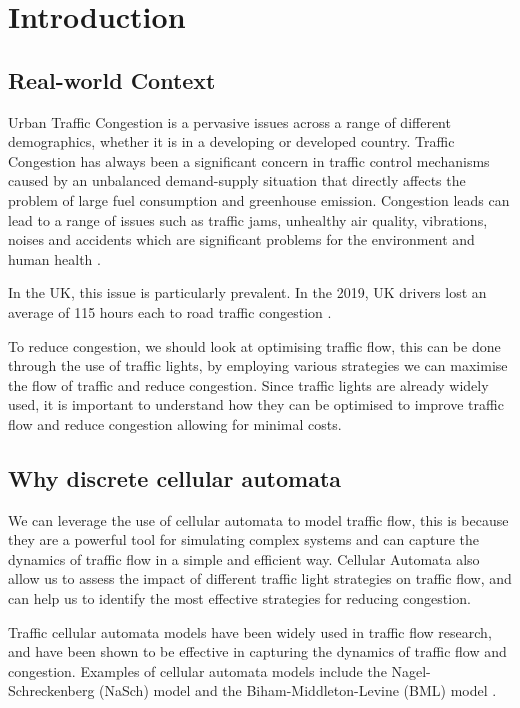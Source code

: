 \section{Introduction}

\subsection{Real-world Context}
Urban Traffic Congestion is a pervasive issues across a range of different demographics, whether it is in a developing or developed country. 
Traffic Congestion has always been a significant concern in traffic control mechanisms caused by an unbalanced demand-supply situation that directly affects the problem of large fuel consumption and greenhouse emission.
Congestion leads can lead to a range of issues such as traffic jams, unhealthy air quality, vibrations, noises and accidents which are significant problems for the environment and human health \cite{jilaniSystematicReviewUrban2025}. 

In the UK, this issue is particularly prevalent. 
In the 2019, UK drivers lost an average of 115 hours each to road traffic congestion \cite{pishue2020INRIXGlobal}.

To reduce congestion, we should look at optimising traffic flow, this can be done through the use of traffic lights, by employing various strategies we can maximise the flow of traffic and reduce congestion. Since traffic lights are already widely used, it is important to understand how they can be optimised to improve traffic flow and reduce congestion allowing for minimal costs.

\subsection{Why discrete cellular automata}
We can leverage the use of cellular automata to model traffic flow, this is because they are a powerful tool for simulating complex systems and can capture the dynamics of traffic flow in a simple and efficient way. Cellular Automata also allow us to assess the impact of different traffic light strategies on traffic flow, and can help us to identify the most effective strategies for reducing congestion.

Traffic cellular automata models have been widely used in traffic flow research, and have been shown to be effective in capturing the dynamics of traffic flow and congestion. Examples of cellular automata models include the Nagel-Schreckenberg (NaSch) model and the Biham-Middleton-Levine (BML) model \cite{nagelCellularAutomatonModel1992,bihamSelforganizationDynamicalTransition1992}.

